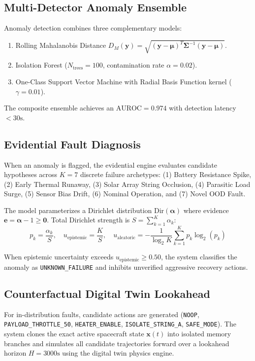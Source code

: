 \documentclass[conference]{IEEEtran}
\begin{document}
\subsection{Multi-Detector Anomaly Ensemble}
Anomaly detection combines three complementary models:
\begin{enumerate}
    \item Rolling Mahalanobis Distance $D_M(\mathbf{y}) = \sqrt{(\mathbf{y} - \boldsymbol{\mu})^T \boldsymbol{\Sigma}^{-1} (\mathbf{y} - \boldsymbol{\mu})}$.
    \item Isolation Forest ($N_{\text{trees}} = 100$, contamination rate $\alpha = 0.02$).
    \item One-Class Support Vector Machine with Radial Basis Function kernel ($\gamma = 0.01$).
\end{enumerate}
The composite ensemble achieves an $\text{AUROC} = 0.974$ with detection latency $< 30\text{s}$.

\subsection{Evidential Fault Diagnosis}
When an anomaly is flagged, the evidential engine evaluates candidate hypotheses across $K=7$ discrete failure archetypes: (1) Battery Resistance Spike, (2) Early Thermal Runaway, (3) Solar Array String Occlusion, (4) Parasitic Load Surge, (5) Sensor Bias Drift, (6) Nominal Operation, and (7) Novel OOD Fault.

The model parameterizes a Dirichlet distribution $\text{Dir}(\boldsymbol{\alpha})$ where evidence $\mathbf{e} = \boldsymbol{\alpha} - 1 \ge \mathbf{0}$. Total Dirichlet strength is $S = \sum_{k=1}^K \alpha_k$:
\begin{equation}
p_k = \frac{\alpha_k}{S}, \quad u_{\text{epistemic}} = \frac{K}{S}, \quad u_{\text{aleatoric}} = -\frac{1}{\log_2 K} \sum_{k=1}^K p_k \log_2(p_k)
\end{equation}

When epistemic uncertainty exceeds $u_{\text{epistemic}} \ge 0.50$, the system classifies the anomaly as \texttt{UNKNOWN\_FAILURE} and inhibits unverified aggressive recovery actions.

\subsection{Counterfactual Digital Twin Lookahead}
For in-distribution faults, candidate actions are generated (\texttt{NOOP}, \texttt{PAYLOAD\_THROTTLE\_50}, \texttt{HEATER\_ENABLE}, \texttt{ISOLATE\_STRING\_A}, \texttt{SAFE\_MODE}). The system clones the exact active spacecraft state $\mathbf{x}(t)$ into isolated memory branches and simulates all candidate trajectories forward over a lookahead horizon $H = 3000\text{s}$ using the digital twin physics engine.
\end{document}

